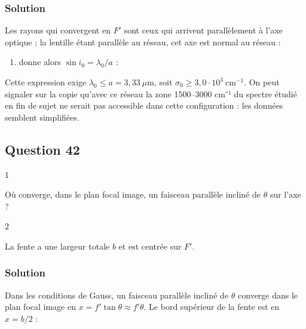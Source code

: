 \documentclass[11pt,a4paper]{article}
\providecommand{\tightlist}{\setlength{\itemsep}{0pt}\setlength{\parskip}{0pt}}
\newcommand{\equationajustee}[1]{%
  \sbox{\boiteequation}{$\displaystyle #1$}%
  \ifdim\wd\boiteequation>\linewidth
    \[\resizebox{\linewidth}{!}{\usebox{\boiteequation}}\]%
  \else
    \[#1\]%
  \fi}
\begin{document}
\hypertarget{solution-40}{%
\subsubsection{Solution}\label{solution-40}}

Les rayons qui convergent en \(F'\) sont ceux qui arrivent parallèlement à l'axe optique ; la lentille étant parallèle au réseau, cet axe est normal au réseau :

\equationajustee{\boxed{\theta = 0}}

\begin{enumerate}
\def\labelenumi{(\arabic{enumi})}
\setcounter{enumi}{8}
\tightlist
\item
  donne alors \(\sin i_0 = \lambda_0/a\) :
\end{enumerate}

\equationajustee{\boxed{i_0 = \arcsin\left(\frac{\lambda_0}{a}\right)}}

Cette expression exige \(\lambda_0 \le a = 3{,}33\ \mu\)m, soit \(\sigma_0 \ge 3{,}0\cdot10^3\ \mathrm{cm^{-1}}\). On peut signaler sur la copie qu'avec ce réseau la zone 1500--3000 cm⁻¹ du spectre étudié en fin de sujet ne serait pas accessible dans cette configuration : les données semblent simplifiées.

\hypertarget{question-42}{%
\subsection{Question 42}\label{question-42}}

\begin{indication}{1}

Où converge, dans le plan focal image, un faisceau parallèle incliné de \(\theta\) sur l'axe ?

\end{indication}

\begin{indication}{2}

La fente a une largeur totale \(b\) et est centrée sur \(F'\).

\end{indication}

\hypertarget{solution-41}{%
\subsubsection{Solution}\label{solution-41}}

Dans les conditions de Gauss, un faisceau parallèle incliné de \(\theta\) converge dans le plan focal image en \(x = f'\tan\theta \approx f'\theta\). Le bord supérieur de la fente est en \(x = b/2\) :
\end{document}
